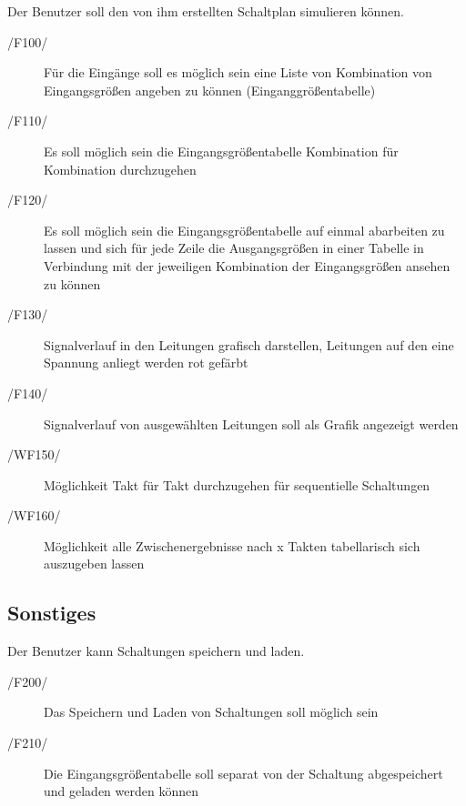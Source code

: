Der Benutzer soll den von ihm erstellten Schaltplan simulieren können. 
\begin{description}
	\item[/F100/] Für die Eingänge soll es möglich sein eine Liste von Kombination von Eingangsgrößen angeben zu können (Einganggrößentabelle)
	\item[/F110/] Es soll möglich sein die Eingangsgrößentabelle Kombination für Kombination durchzugehen
	\item[/F120/] Es soll möglich sein die Eingangsgrößentabelle auf einmal abarbeiten zu lassen und sich für jede Zeile die Ausgangsgrößen in einer Tabelle in Verbindung mit der jeweiligen Kombination der Eingangsgrößen ansehen zu können
	\item[/F130/] Signalverlauf in den Leitungen grafisch darstellen, Leitungen auf den eine Spannung anliegt werden rot gefärbt
	\item[/F140/] Signalverlauf von ausgewählten Leitungen soll als Grafik angezeigt werden
	
	\item[/WF150/] Möglichkeit Takt für Takt durchzugehen für sequentielle Schaltungen
	\item[/WF160/] Möglichkeit alle Zwischenergebnisse nach x Takten tabellarisch sich auszugeben lassen
\end{description}

\subsection{Sonstiges}

Der Benutzer kann Schaltungen speichern und laden.
\begin{description}
	\item[/F200/] Das Speichern und Laden von Schaltungen soll möglich sein
	\item[/F210/] Die Eingangsgrößentabelle soll separat von der Schaltung abgespeichert und geladen werden können
\end{description}
